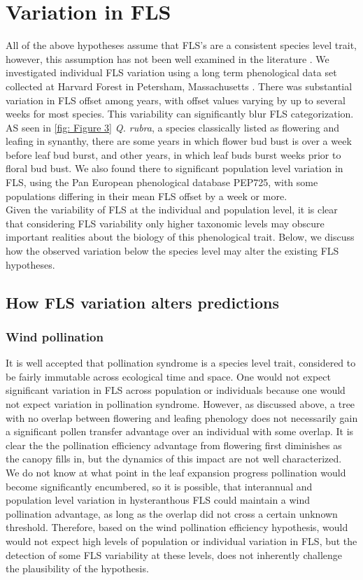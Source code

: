 \documentclass[12pt]{article}\usepackage[]{graphicx}\usepackage[]{color}
\begin{document}
\section*{Variation in FLS}
 \indent\indent All of the above hypotheses assume that FLS's are a consistent species level trait, however, this assumption has not been well examined in the literature \citep{Gougherty2018}. We investigated individual FLS variation using a long term phenological data set collected at Harvard Forest in Petersham, Massachusetts \citep{OKeefe2015}. There was substantial variation in FLS offset among years, with offset values varying by up to several weeks for most species.  This variability  can significantly blur FLS categorization. AS seen in \ref{fig: Figure 3} \textit{Q. rubra}, a species classically listed as flowering and leafing in synanthy, there are some years in which flower bud bust is over a week before leaf bud burst, and other years, in which leaf buds burst weeks prior to floral bud bust. We also found there to significant population level variation in FLS, using the Pan European phenological database PEP725\citep{PEP725}, with some populations differing in their mean FLS offset by a week or more.\\
\indent Given the variability of FLS at the individual and population level, it is clear that considering FLS variability only higher taxonomic levels may obscure important realities about the biology of this phenological trait. Below, we discuss how the observed variation below the species level may alter the existing FLS hypotheses.

\subsection*{How FLS variation alters predictions}
\subsubsection*{Wind pollination} 
\indent\indent It is well accepted that pollination syndrome is a species level trait, considered to be fairly immutable across ecological time and space. One would not expect significant variation in FLS across population or individuals because one would not expect variation in pollination syndrome. However, as discussed above, a tree with no overlap between flowering and leafing phenology does not necessarily gain a significant pollen transfer advantage over an individual with some overlap. It is clear the the pollination efficiency advantage from flowering first diminishes as the canopy fills in, but the dynamics of this impact are not well characterized. We do not know at what point in the leaf expansion progress pollination would become significantly encumbered, so it is possible, that interannual and population level variation in hysteranthous FLS could maintain a wind pollination advantage, as long as the overlap did not cross a certain unknown threshold. Therefore, based on the wind pollination efficiency hypothesis, would would not expect high levels of population or individual variation in FLS, but the detection of some FLS variability at these levels, does not inherently challenge the plausibility of the hypothesis. %
\end{document}
